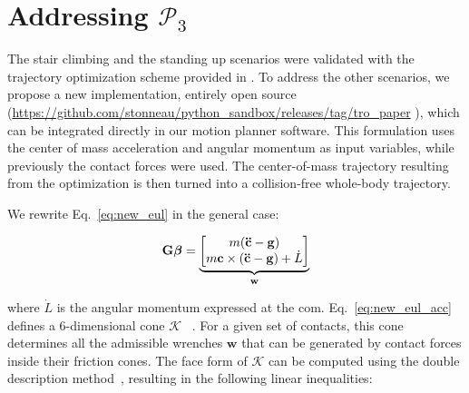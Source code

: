 \section{Addressing $\mathcal{P}_3$}
\label{app:optim}
The stair climbing and the standing up scenarios were validated with the trajectory optimization scheme provided in \citeauthor{Carpentier2016}. 
To address the other scenarios, we propose a new implementation, entirely open source (\url{https://github.com/stonneau/python_sandbox/releases/tag/tro_paper} ), which can be integrated directly in our motion planner software. This formulation uses the center of mass acceleration and angular momentum as input variables, while previously the contact forces were used.
The center-of-mass trajectory resulting from the optimization is then turned into a collision-free whole-body trajectory.

We rewrite Eq.~\ref{eq:new_eul} in the general case:


\begin{align} \label{eq:new_eul_acc}
\mathbf{G} \bm{\beta} = 
\underbrace{\mat{m (\mathbf{\ddot{c}} - \mathbf{g}) \\m \mathbf{c} \times (\mathbf{\ddot{c}} - \mathbf{g}) + \dot{L}}}_{\mathbf{w}}
\end{align}

where $\dot{L}$ is the angular momentum expressed at the com.
Eq.~\ref{eq:new_eul_acc} defines a 6-dimensional cone $\mathcal{K}$ ~\citep{qiu:dhm:2011,Caron2015}. For a given set of contacts,
this cone determines all the admissible wrenches $\mathbf{w}$ that can be generated by contact forces inside their friction cones.
The face form of $\mathcal{K}$ can be computed using the double description method~\citep{Fukuda1996}, resulting in the following linear inequalities:

